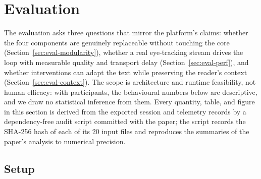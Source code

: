 \section{Evaluation}
\label{sec:eval}

The evaluation asks three questions that mirror the platform's claims: whether the four components are genuinely replaceable without touching the core (Section~\ref{sec:eval-modularity}), whether a real eye-tracking stream drives the loop with measurable quality and transport delay (Section~\ref{sec:eval-perf}), and whether interventions can adapt the text while preserving the reader's context (Section~\ref{sec:eval-context}).
The scope is architecture and runtime feasibility, not human efficacy: with \participantsN{} participants, the behavioural numbers below are descriptive, and we draw no statistical inference from them.
Every quantity, table, and figure in this section is derived from the exported session and telemetry records by a dependency-free audit script committed with the paper; the script records the SHA-256 hash of each of its 20 input files and reproduces the summaries of the paper's analysis to numerical precision.

\subsection{Setup}
\label{sec:eval-setup}

